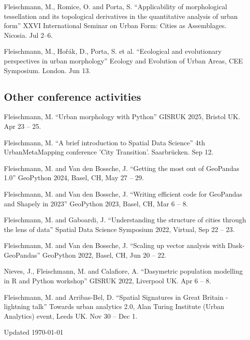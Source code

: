 \documentclass[12pt,a4paper]{report}
\begin{document}
\begin{tablist}
        \item[2019] \tab{}Fleischmann, M., Romice, O. and Porta, S. \enquote{Applicability of morphological tessellation and its topological derivatives in the quantitative analysis of urban form} XXVI International Seminar on Urban Form: Cities as Assemblages. Nicosia. \@ Jul 2--6.

        \item[2019] \tab{}Fleischmann, M., Hořák, D., Porta, S. et al. \enquote{Ecological and evolutionary perspectives in urban morphology} Ecology and Evolution of Urban Areas, CEE Symposium. London. \@ Jun 13.


    \end{tablist}

    \subsection*{Other conference activities}

    \begin{tablist}

        \item[2025] \tab{}Fleischmann, M. \enquote{Urban morphology with Python} GISRUK 2025, Bristol UK. Apr 23 -- 25.
        \item[2024] \tab{}Fleischmann, M. \enquote{A brief introduction to Spatial Data Science} 4th UrbanMetaMapping conference 'City Transition'. Saarbrücken. Sep 12.
        \item[2023] \tab{}Fleischmann, M. and Van den Bossche, J. \enquote{Getting the most out of GeoPandas 1.0} GeoPython 2024, Basel, CH, May 27 -- 29.
        \item[2023] \tab{}Fleischmann, M. and Van den Bossche, J. \enquote{Writing efficient code for GeoPandas and Shapely in 2023} GeoPython 2023, Basel, CH, Mar 6 -- 8.
        \item[2022] \tab{}Fleischmann, M. and Gaboardi, J. \enquote{Understanding the structure of cities through the lens of data} Spatial Data Science Symposium 2022, Virtual, Sep 22 -- 23.
        \item[2022] \tab{}Fleischmann, M. and Van den Bossche, J. \enquote{Scaling up vector analysis with Dask-GeoPandas} GeoPython 2022, Basel, CH, Jun 20 -- 22.
        \item[2022] \tab{}Nieves, J., Fleischmann, M. and Calafiore, A. \enquote{Dasymetric population modelling in R and Python workshop} GISRUK 2022, Liverpool UK. Apr 6 -- 8.
        \item[2021] \tab{}Fleischmann, M. and Arribas-Bel, D. \enquote{Spatial Signatures in Great Britain - lightning talk} Towards urban analytics 2.0, Alan Turing Institute (Urban Analytics) event, Leeds UK. Nov 30 -- Dec 1.

    \end{tablist}

    \begin{center}
        \vfill
        Updated \monthyeardate\today
    \end{center}
\end{document}
